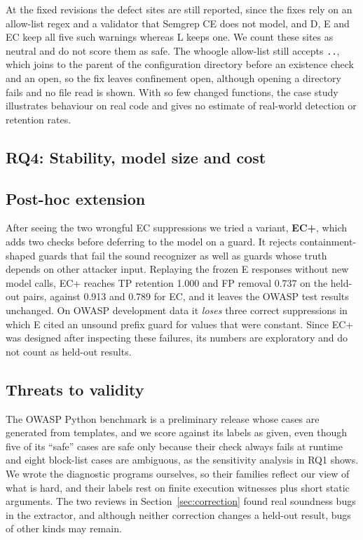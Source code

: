 At the fixed revisions the defect sites are still reported, since the fixes rely on an allow-list regex and a validator that Semgrep CE does not model, and D, E and EC keep all five such warnings whereas L keeps one. We count these sites as neutral and do not score them as safe. The whoogle allow-list still accepts \texttt{..}, which joins to the parent of the configuration directory before an existence check and an open, so the fix leaves confinement open, although opening a directory fails and no file read is shown. With so few changed functions, the case study illustrates behaviour on real code and gives no estimate of real-world detection or retention rates.

\subsection{RQ4: Stability, model size and cost}


\begin{table}[t]
\caption{LLM resources per held-out run.}
\label{tab:resources}
\resizebox{\columnwidth}{!}{}
\end{table}

\subsection{Post-hoc extension}
After seeing the two wrongful EC suppressions we tried a variant, \textbf{EC+}, which adds two checks before deferring to the model on a guard. It rejects containment-shaped guards that fail the sound recognizer as well as guards whose truth depends on other attacker input. Replaying the frozen E responses without new model calls, EC+ reaches TP retention 1.000 and FP removal 0.737 on the held-out pairs, against 0.913 and 0.789 for EC, and it leaves the OWASP test results unchanged. On OWASP development data it \emph{loses} three correct suppressions in which E cited an unsound prefix guard for values that were constant. Since EC+ was designed after inspecting these failures, its numbers are exploratory and do not count as held-out results.

\subsection{Threats to validity}
The OWASP Python benchmark is a preliminary release whose cases are generated from templates, and we score against its labels as given, even though five of its ``safe'' cases are safe only because their check always fails at runtime and eight block-list cases are ambiguous, as the sensitivity analysis in RQ1 shows. We wrote the diagnostic programs ourselves, so their families reflect our view of what is hard, and their labels rest on finite execution witnesses plus short static arguments. The two reviews in Section~\ref{sec:correction} found real soundness bugs in the extractor, and although neither correction changes a held-out result, bugs of other kinds may remain.

